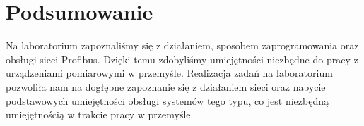 \documentclass{article}
\begin{document}
\newpage
\section{Podsumowanie}
Na laboratorium zapoznaliśmy się z działaniem, sposobem zaprogramowania oraz obsługi sieci Profibus. Dzięki temu zdobyliśmy umiejętności niezbędne do pracy z urządzeniami pomiarowymi w przemyśle. Realizacja zadań na laboratorium pozwoliła nam na dogłębne zapoznanie się z działaniem sieci oraz nabycie podstawowych umiejętności obsługi systemów tego typu, co jest niezbędną umiejętnością w trakcie pracy w przemyśle.
\end{document}
